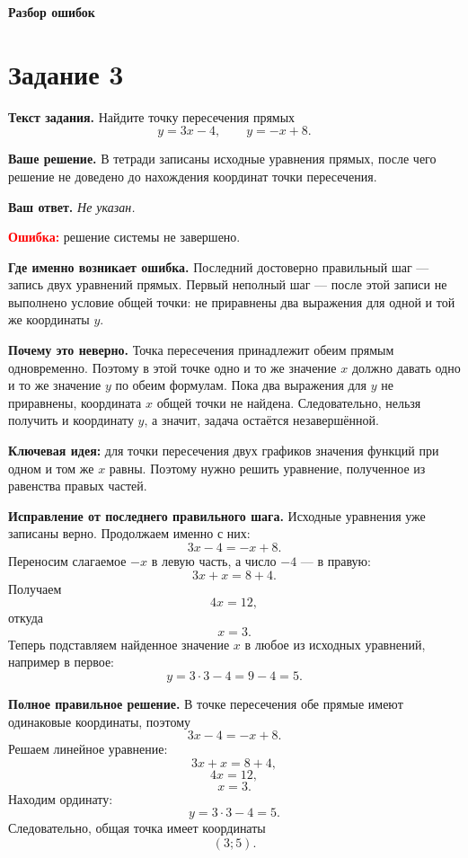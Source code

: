 \documentclass[12pt,a4paper]{article}
\newcommand{\studentanswer}[1]{\textit{#1}}
\begin{document}
\newpage
\thispagestyle{empty}
\vspace*{\fill}
\begin{center}
  {\Huge\bfseries Разбор ошибок}
\end{center}
\vspace*{\fill}
\newpage

\label{task:3}
\section*{Задание 3}

\textbf{Текст задания.}
Найдите точку пересечения прямых
\[
y=3x-4, \qquad y=-x+8.
\]

\textbf{Ваше решение.}
В тетради записаны исходные уравнения прямых, после чего решение не доведено до нахождения координат точки пересечения.

\textbf{Ваш ответ.}
\studentanswer{Не указан.}

\textcolor{red}{\textbf{Ошибка:}} решение системы не завершено.

\textbf{Где именно возникает ошибка.}
Последний достоверно правильный шаг --- запись двух уравнений прямых. Первый неполный шаг --- после этой записи не выполнено условие общей точки: не приравнены два выражения для одной и той же координаты $y$.

\textbf{Почему это неверно.}
Точка пересечения принадлежит обеим прямым одновременно. Поэтому в этой точке одно и то же значение $x$ должно давать одно и то же значение $y$ по обеим формулам. Пока два выражения для $y$ не приравнены, координата $x$ общей точки не найдена. Следовательно, нельзя получить и координату $y$, а значит, задача остаётся незавершённой.

\textcolor{blue!60!black}{\textbf{Ключевая идея:}}
для точки пересечения двух графиков значения функций при одном и том же $x$ равны. Поэтому нужно решить уравнение, полученное из равенства правых частей.

\textbf{Исправление от последнего правильного шага.}
Исходные уравнения уже записаны верно. Продолжаем именно с них:
\[
3x-4=-x+8.
\]
Переносим слагаемое $-x$ в левую часть, а число $-4$ --- в правую:
\[
3x+x=8+4.
\]
Получаем
\[
4x=12,
\]
откуда
\[
x=3.
\]
Теперь подставляем найденное значение $x$ в любое из исходных уравнений, например в первое:
\[
y=3\cdot 3-4=9-4=5.
\]

\textbf{Полное правильное решение.}
В точке пересечения обе прямые имеют одинаковые координаты, поэтому
\[
3x-4=-x+8.
\]
Решаем линейное уравнение:
\[
3x+x=8+4,
\]
\[
4x=12,
\]
\[
x=3.
\]
Находим ординату:
\[
y=3\cdot 3-4=5.
\]
Следовательно, общая точка имеет координаты
\[
(3;5).
\]
\end{document}
